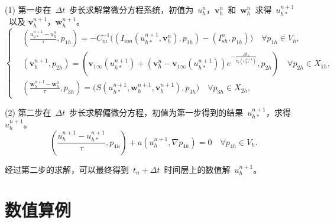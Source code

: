 \documentclass[twoside,UTF8]{nputhesis}
\begin{document}
(1) 第一步在~$\Delta t$~步长求解常微分方程系统，初值为~$u^n_h$，$\textbf{v}^n_h$~和~$\textbf{w}^n_h$~求得~$u^{n+1}_{h*}$~以及
$\textbf{v}^{n+1}_{h}$，$\textbf{w}^{n+1}_{h}$。
\begin{equation}
\left\{\begin{aligned}&(\frac{u^{n+1}_{h*}-u^n_h}{\tau},p_{1h})=-C_m^{-1}\big((I_{ion}(u^{n+1}_{h*},\textbf{v}^n_h),p_{1h})-(I_{sh}^n,p_{1h})\big)\quad \forall  p_{1h}\in V_h,
\\&(\textbf{v}^{n+1}_{h},p_{2h})=(\textbf{v}_{1\infty}(u^{n+1}_{h*})+(\textbf{v}^{n}_{h}-\textbf{v}_{1\infty}(u^{n+1}_{h*}))e^{-\frac{\Delta t_n}{\tau_\textbf{v}(u^{n+1}_{h*})}},p_{2h})\quad \forall p_{2h}\in X_{1h},
\\&(\frac{\textbf{w}^{n+1}_{h}-\textbf{w}^n_{h}}{\tau},p_{3h})=\big(S(u^{n+1}_{h*},\textbf{w}^{n+1}_{h},\textbf{v}^{n+1}_{h}),p_{3h}\big)\quad \forall p_{3h}\in X_{2h},\end{aligned}\right.
\label{093}
\end{equation}

(2) 第二步在~$\Delta t$~步长求解偏微分方程，初值为第一步得到的结果~$u^{n+1}_{h*}$，求得~$u^{n+1}_{h}$。
\begin{equation}
(\frac{u^{n+1}_{h}-u^{n+1}_{h*}}{\tau},p_{4h})+a(u^{n+1}_{h},\nabla p_{4h})=0\quad \forall p_{4h}\in V_h.
\label{094}
\end{equation}

经过第二步的求解，可以最终得到~$t_n+\Delta t$~时间层上的数值解~$u^{n+1}_h$。
\section{数值算例}
\end{document}
